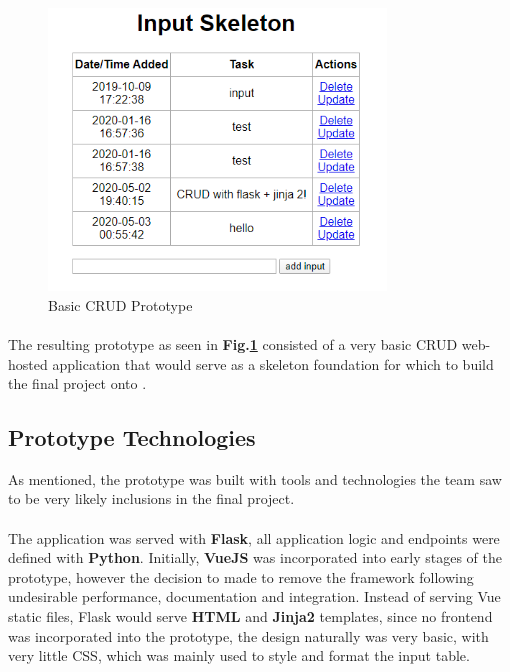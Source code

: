 \begin{figure}[H]
	\caption{Basic CRUD Prototype}
	\label{image:prototype}
	\centering
	\includegraphics[width=0.8\textwidth]{images/prototype.png}
\end{figure}	

\paragraph{}
The resulting prototype as seen in \textbf{Fig.\ref{image:prototype}} consisted of a very basic CRUD web-hosted application that would serve as a skeleton foundation for which to build the final project onto \cite{PROTOTYPE}.

\subsection{Prototype Technologies}
As mentioned, the prototype was built with tools and technologies the team saw to be very likely inclusions in the final project. 

\paragraph{}
The application was served with \textbf{Flask}, all application logic and endpoints were defined with \textbf{Python}. Initially, \textbf{VueJS} was incorporated into early stages of the prototype, however the decision to made to remove the framework following undesirable performance, documentation and integration. Instead of serving Vue static files, Flask would serve \textbf{HTML} and \textbf{Jinja2} templates, since no frontend was incorporated into the prototype, the design naturally was very basic, with very little CSS, which was mainly used to style and format the input table.

